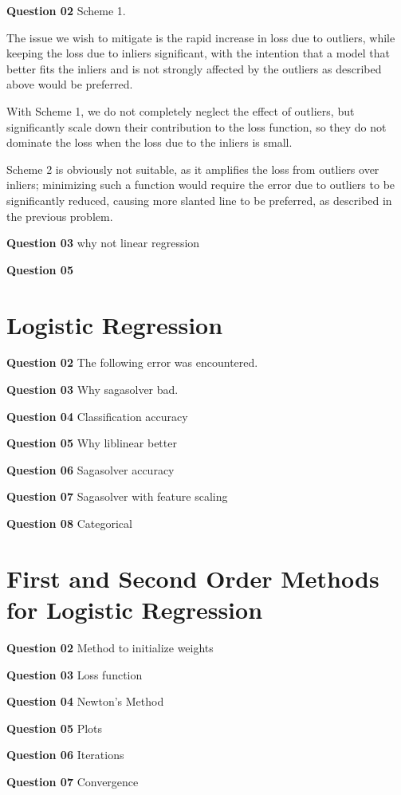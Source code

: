 \documentclass{article}[a4paper]
\begin{document}
	\textbf{Question 02} Scheme 1.
	
	The issue we wish to mitigate is the rapid increase in loss due to outliers, while keeping the loss due to inliers significant, with the intention that a model that better fits the inliers and is not strongly affected by the outliers as described above would be preferred.
	\newline

	With Scheme 1, we do not completely neglect the effect of outliers, but significantly scale down their contribution to the loss function, so they do not dominate the loss when the loss due to the inliers is small.
	\newline

	Scheme 2 is obviously not suitable, as it amplifies the loss from outliers over inliers; minimizing such a function would require the error due to outliers to be significantly reduced, causing more slanted line to be preferred, as described in the previous problem.
	\newline

	\textbf{Question 03} why not linear regression
	\newline

	\textbf{Question 05}

	\section{Logistic Regression}

	\textbf{Question 02} The following error was encountered.
	\newline

	\textbf{Question 03} Why sagasolver bad.
	\newline
	
	\textbf{Question 04} Classification accuracy
	\newline

	\textbf{Question 05} Why liblinear better
	\newline

	\textbf{Question 06} Sagasolver accuracy
	\newline

	\textbf{Question 07} Sagasolver with feature scaling
	\newline

	\textbf{Question 08} Categorical

	\section{First and Second Order Methods for Logistic Regression}

	\textbf{Question 02} Method to initialize weights
	\newline

	\textbf{Question 03} Loss function
	\newline

	\textbf{Question 04} Newton's Method
	\newline

	\textbf{Question 05} Plots
	\newline

	\textbf{Question 06} Iterations
	\newline

	\textbf{Question 07} Convergence
\end{document}
